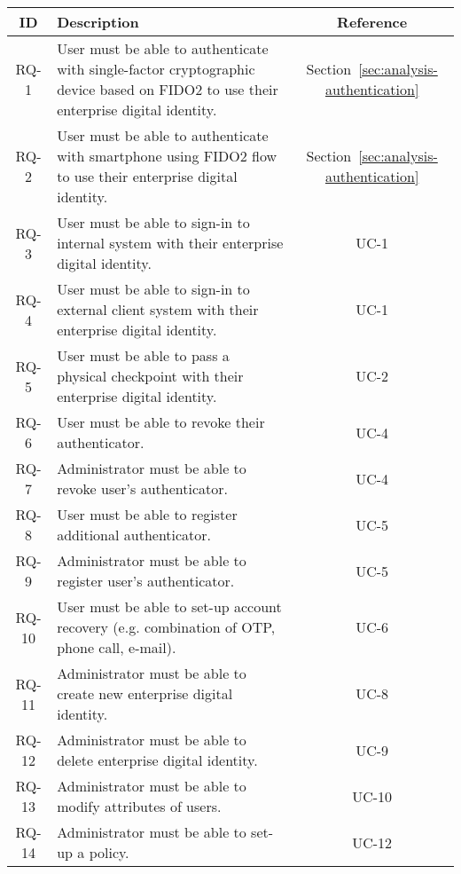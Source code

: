 \begin{table}[H]
    \footnotesize
    \onehalfspacing
    \centering
    \begin{tabular}{|c|p{12cm}|c|}
    \hline
    \cellcolor[HTML]{CBCEFB}\textbf{ID}&\cellcolor[HTML]{CBCEFB}\textbf{Description}&\cellcolor[HTML]{CBCEFB}\textbf{Reference}\\
    \hline
    RQ-1&User must be able to authenticate with single-factor cryptographic device based on FIDO2 to use their enterprise digital identity.&Section~\ref{sec:analysis-authentication}\\
    \hline
    RQ-2&User must be able to authenticate with smartphone using FIDO2 flow to use their enterprise digital identity.&Section~\ref{sec:analysis-authentication}\\
    \hline
    \hline
    RQ-3&User must be able to sign-in to internal system with their enterprise digital identity.&UC-1\\
    \hline
    RQ-4&User must be able to sign-in to external client system with their enterprise digital identity.&UC-1\\
    \hline
    \hline
    RQ-5&User must be able to pass a physical checkpoint with their enterprise digital identity.&UC-2\\
    \hline
    \hline
    RQ-6&User must be able to revoke their authenticator.&UC-4\\
    \hline
    RQ-7&Administrator must be able to revoke user’s authenticator.&UC-4\\
    \hline
    \hline
    RQ-8&User must be able to register additional authenticator.&UC-5\\
    \hline
    RQ-9&Administrator must be able to register user’s authenticator.&UC-5\\
    \hline
    \hline
    RQ-10&User must be able to set-up account recovery (e.g. combination of OTP, phone call, e-mail).&UC-6\\
    \hline
    \hline
    RQ-11&Administrator must be able to create new enterprise digital identity.&UC-8\\
    \hline
    RQ-12&Administrator must be able to delete enterprise digital identity.&UC-9\\
    \hline
    \hline
    RQ-13&Administrator must be able to modify attributes of users.&UC-10\\
    \hline
    \hline
    RQ-14&Administrator must be able to set-up a policy.&UC-12\\

\end{tabular}
\end{table}
